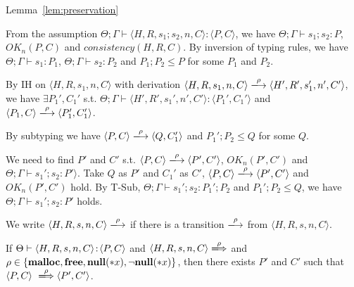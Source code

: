 \begin{pfof}{Lemma~\ref{lem:preservation}}
\begin{itemize}
  From the assumption \(\Theta; \Gamma \vdash \langle H, R, s_1;s_2,
  n, C \rangle : \langle P, C \rangle\), we have \(\Theta; \Gamma
  \vdash s_1;s_2 : P\), \(OK_n(P, C)\) and \(consistency(H, R,
  C)\). By inversion of typing rules, we have \(\Theta; \Gamma \vdash
  s_1: P_1\), \(\Theta; \Gamma \vdash s_2: P_2\) and \(P_1;P_2 \le P\)
  for some \(P_1\) and \(P_2\).

  By IH on \( \langle H, R, s_1, n, C \rangle \) with derivation \(
  \langle H, R, s_1, n, C \rangle \xlongrightarrow{\rho} \langle H',
  R', s_1', n', C' \rangle\), we have \(\exists P_1',C_1'\)
  s.t. \(\Theta; \Gamma \vdash \langle H', R', s_1', n', C' \rangle :
  \langle P_1', C_1' \rangle\) and \( \langle P_1, C \rangle
  \xlongrightarrow{\rho} \langle P_1', C_1' \rangle\).

  By subtyping we have \( \langle P, C \rangle \xlongrightarrow{\rho}
  \langle Q, C_1' \rangle \) and \(P_1';P_2 \le Q\) for some \(Q\).

  We need to find \(P'\) and \(C'\) s.t. \( \langle P, C \rangle
  \xlongrightarrow{\rho} \langle P', C' \rangle \), \( OK_n(P', C')\)
  and \(\Theta; \Gamma \vdash s_1';s_2 : P' \rangle\).  Take \(Q\) as
  \(P'\) and \(C_1'\) as \(C'\), \( \langle P, C \rangle
  \xlongrightarrow{\rho} \langle P', C' \rangle \) and \( OK_n(P',
  C')\) hold. By T-Sub, \(\Theta; \Gamma \vdash s_1';s_2 : P_1';P_2\)
  and \(P_1';P_2 \le Q\), we have \(\Theta; \Gamma \vdash s_1';s_2 :
  P'\) holds.

\end{itemize}
\end{pfof}  


We write \(\langle H, R, s, n, C \rangle \xlongrightarrow{\rho}\) if
there is a transition \(\xlongrightarrow{\rho}\) from \(\langle H, R,
s, n, C \rangle\).

\begin{lemma}
\label{lem:enabled}
If \(\Theta \vdash \langle H, R, s, n, C \rangle \!:\! \langle
P,C \rangle\) and \(\langle H, R, s, n, C \rangle
\xLongrightarrow{\rho}\) and \(\rho \in \{\mathbf{malloc}, \mathbf{free}, {\bf null}(*x), \neg{\bf null}(*x)\}\), then
there exists \(P'\) and \(C'\) such that \( \langle P, C \rangle
\ \xLongrightarrow{\rho} \langle P', C'\rangle\).
\end{lemma}

